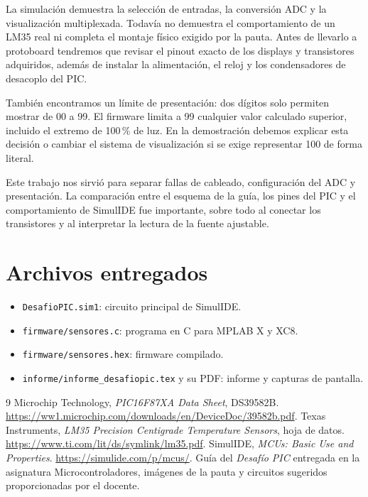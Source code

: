 \documentclass[11pt,a4paper]{article}
\begin{document}
La simulación demuestra la selección de entradas, la conversión ADC y la visualización multiplexada. Todavía no demuestra el comportamiento de un LM35 real ni completa el montaje físico exigido por la pauta. Antes de llevarlo a protoboard tendremos que revisar el pinout exacto de los displays y transistores adquiridos, además de instalar la alimentación, el reloj y los condensadores de desacoplo del PIC.

También encontramos un límite de presentación: dos dígitos solo permiten mostrar de 00 a 99. El firmware limita a 99 cualquier valor calculado superior, incluido el extremo de 100\,\% de luz. En la demostración debemos explicar esta decisión o cambiar el sistema de visualización si se exige representar 100 de forma literal.

Este trabajo nos sirvió para separar fallas de cableado, configuración del ADC y presentación. La comparación entre el esquema de la guía, los pines del PIC y el comportamiento de SimulIDE fue importante, sobre todo al conectar los transistores y al interpretar la lectura de la fuente ajustable.

\section*{Archivos entregados}

\begin{itemize}
  \item \texttt{DesafioPIC.sim1}: circuito principal de SimulIDE.
  \item \texttt{firmware/sensores.c}: programa en C para MPLAB X y XC8.
  \item \texttt{firmware/sensores.hex}: firmware compilado.
  \item \texttt{informe/informe\_desafiopic.tex} y su PDF: informe y capturas de pantalla.
\end{itemize}

\begin{thebibliography}{9}
 Microchip Technology, \emph{PIC16F87XA Data Sheet}, DS39582B. \url{https://ww1.microchip.com/downloads/en/DeviceDoc/39582b.pdf}.
 Texas Instruments, \emph{LM35 Precision Centigrade Temperature Sensors}, hoja de datos. \url{https://www.ti.com/lit/ds/symlink/lm35.pdf}.
 SimulIDE, \emph{MCUs: Basic Use and Properties}. \url{https://simulide.com/p/mcus/}.
 Guía del \emph{Desafío PIC} entregada en la asignatura Microcontroladores, imágenes de la pauta y circuitos sugeridos proporcionadas por el docente.
\end{thebibliography}
\end{document}
